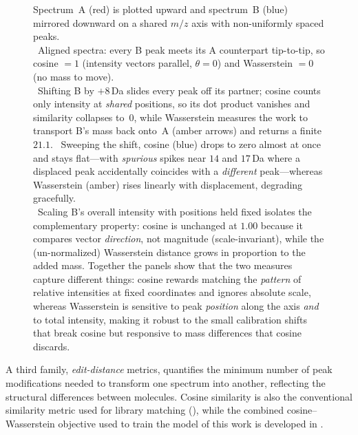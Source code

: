 \begin{figure}[p]
    \caption[Cosine similarity versus Wasserstein distance as spectral comparison measures]{
        Spectrum~A (red) is plotted upward and spectrum~B (blue) mirrored downward on a shared $m/z$ axis with non-uniformly spaced peaks. \\
        ~Aligned spectra: every B peak meets its A counterpart tip-to-tip, so cosine $=1$ (intensity vectors parallel, $\theta = 0$) and Wasserstein $=0$ (no mass to move). \\
        ~Shifting B by $+8$\,Da slides every peak off its partner; cosine counts only intensity at \emph{shared} positions, so its dot product vanishes and similarity collapses to~$0$, while Wasserstein measures the work to transport B's mass back onto~A (amber arrows) and returns a finite $21.1$.
        ~Sweeping the shift, cosine (blue) drops to zero almost at once and stays flat---with \emph{spurious} spikes near $14$ and $17$\,Da where a displaced peak accidentally coincides with a \emph{different} peak---whereas Wasserstein (amber) rises linearly with displacement, degrading gracefully. \\
        ~Scaling B's overall intensity with positions held fixed isolates the complementary property: cosine is unchanged at $1.00$ because it compares vector \emph{direction}, not magnitude (scale-invariant), while the (un-normalized) Wasserstein distance grows in proportion to the added mass.
        Together the panels show that the two measures capture different things: cosine rewards matching the \emph{pattern} of relative intensities at fixed coordinates and ignores absolute scale, whereas Wasserstein is sensitive to peak \emph{position} along the axis \emph{and} to total intensity, making it robust to the small calibration shifts that break cosine but responsive to mass differences that cosine discards.
    }
    \label{fig:cosine-versus-wasserstein}
\end{figure}

A third family, \emph{edit-distance} metrics, quantifies the minimum number of peak modifications needed to transform one spectrum into another, reflecting the structural differences between molecules. \cite[pp.~1--2]{Maekinen2007}
Cosine similarity is also the conventional similarity metric used for library matching (), while the combined cosine--Wasserstein objective used to train the model of this work is developed in .

